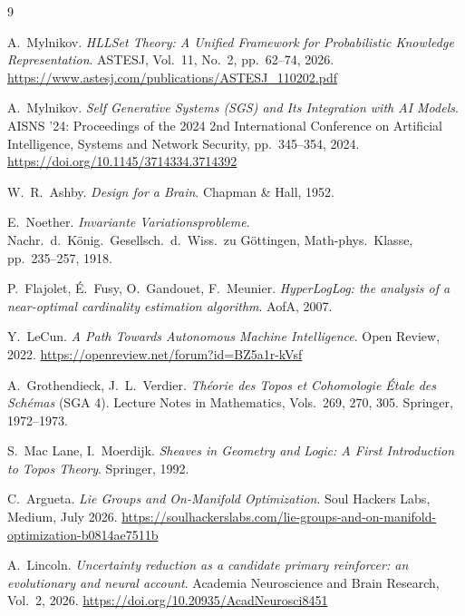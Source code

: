 \documentclass[11pt,a4paper]{article}
\theoremstyle{remark}
\begin{document}
\begin{thebibliography}{9}

A.~Mylnikov.
\emph{HLLSet Theory: A Unified Framework for Probabilistic Knowledge Representation}.
ASTESJ, Vol.~11, No.~2, pp.~62--74, 2026.
\url{https://www.astesj.com/publications/ASTESJ_110202.pdf}

A.~Mylnikov.
\emph{Self Generative Systems (SGS) and Its Integration with AI Models}.
AISNS '24: Proceedings of the 2024 2nd International Conference on Artificial
Intelligence, Systems and Network Security, pp.~345--354, 2024.
\url{https://doi.org/10.1145/3714334.3714392}

W.~R.~Ashby.
\emph{Design for a Brain}.
Chapman \& Hall, 1952.

E.~Noether.
\emph{Invariante Variationsprobleme}.
Nachr.~d.~K\"onig.~Gesellsch.~d.~Wiss.~zu G\"ottingen, Math-phys.~Klasse,
pp.~235--257, 1918.

P.~Flajolet, \'{E}.~Fusy, O.~Gandouet, F.~Meunier.
\emph{HyperLogLog: the analysis of a near-optimal cardinality estimation algorithm}.
AofA, 2007.

Y.~LeCun.
\emph{A Path Towards Autonomous Machine Intelligence}.
Open Review, 2022.
\url{https://openreview.net/forum?id=BZ5a1r-kVsf}

A.~Grothendieck, J.~L.~Verdier.
\emph{Th\'eorie des Topos et Cohomologie \'Etale des Sch\'emas} (SGA 4).
Lecture Notes in Mathematics, Vols.~269, 270, 305. Springer, 1972--1973.

S.~Mac Lane, I.~Moerdijk.
\emph{Sheaves in Geometry and Logic: A First Introduction to Topos Theory}.
Springer, 1992.

C.~Argueta.
\emph{Lie Groups and On-Manifold Optimization}.
Soul Hackers Labs, Medium, July 2026.
\url{https://soulhackerslabs.com/lie-groups-and-on-manifold-optimization-b0814ae7511b}

A.~Lincoln.
\emph{Uncertainty reduction as a candidate primary reinforcer: an evolutionary
and neural account}.
Academia Neuroscience and Brain Research, Vol.~2, 2026.
\url{https://doi.org/10.20935/AcadNeurosci8451}

\end{thebibliography}

\end{document}

